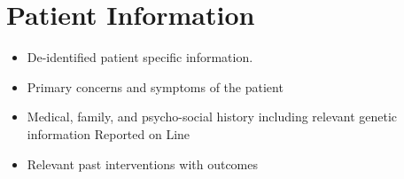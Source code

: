 \section{Patient Information}

\begin{itemize}
    \item De-identified patient specific information.
    \item Primary concerns and symptoms of the patient
    \item Medical, family, and psycho-social history including relevant genetic information Reported on Line
    \item Relevant past interventions with outcomes

\end{itemize}
